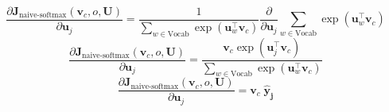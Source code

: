 \documentclass[12pt]{article}
\begin{document}
\begin{equation*}
    \frac{\partial \bm J_{\text{naive-softmax}}(\bm v_c, o, \bm U)}{\partial \bm u_j} = 
    \frac{1}{\sum_{w \in \text{Vocab}} \exp(\bm u_{w}^\top \bm v_c)}
    \frac{\partial}{\partial \bm u_j} \sum_{w \in \text{Vocab}} \exp(\bm u_{w}^\top \bm v_c)
\end{equation*}
\begin{equation*}
    \frac{\partial \bm J_{\text{naive-softmax}}(\bm v_c, o, \bm U)}{\partial \bm u_j} = 
    \frac{\bm v_c \exp(\bm u_{j}^\top \bm v_c)}{\sum_{w \in \text{Vocab}} \exp(\bm u_{w}^\top \bm v_c)}
\end{equation*}
\begin{equation*}
    \frac{\partial \bm J_{\text{naive-softmax}}(\bm v_c, o, \bm U)}{\partial \bm u_j} = 
    \bm v_c \; \bm {\hat y_j}
\end{equation*}

\end{document}
